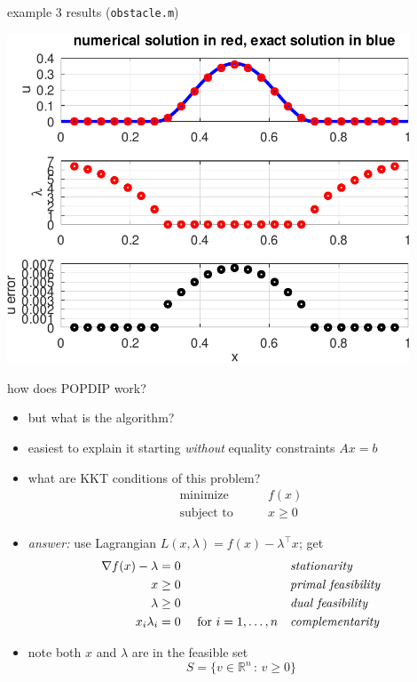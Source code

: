 \documentclass[10pt,hyperref,dvipsnames]{beamer}
\newcommand{\grad}{\nabla}
\newcommand{\RR}{\mathbb{R}}
\begin{document}
\begin{frame}{example 3 results (\texttt{obstacle.m})}

\medskip
\begin{center}
\includegraphics[width=0.9\textwidth]{figs/errorobstacle.pdf}
\end{center}
\end{frame}


\begin{frame}{how does POPDIP work?}

\begin{itemize}
\item but what is the algorithm?
\item easiest to explain it starting \emph{without} equality constraints $Ax=b$
\item what are KKT conditions of this problem?
\begin{equation*}
\begin{matrix}
\text{minimize} \qquad & f(x) \\
\text{subject to} \qquad & x \ge 0
\end{matrix}
\end{equation*}
\item[] \emph{answer:} use Lagrangian $L(x,\lambda) = f(x) - \lambda^\top x$; get
\begin{align*}
\grad f(x) - \lambda &= 0   &&\text{\emph{stationarity}} \\
                   x &\ge 0 &&\text{\emph{primal feasibility}} \\
             \lambda &\ge 0 &&\text{\emph{dual feasibility}} \\
        x_i \lambda_i&= 0 \quad \text{ for } i=1,\dots,n && \text{\emph{complementarity}}
\end{align*}
\item note both $x$ and $\lambda$ are in the feasible set
	$$S = \{v \in \RR^n \,:\, v\ge 0\}$$
\end{itemize}
\end{frame}
\end{document}
